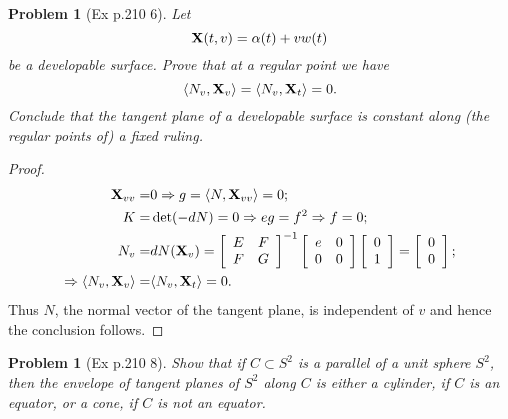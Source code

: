 \documentclass[10pt,a4paper]{article}
\newcounter{theProblemCounter}
\newtheorem{problem}[theProblemCounter]{Problem}
\begin{document}
\setcounter{theProblemCounter}{3}
\begin{problem}[Ex p.210 6]
Let \[
\mathbf{X}(t, v)=\alpha(t)+vw(t)
\]
be a developable surface. Prove that at a regular point we have
\[
\left\langle N_v, \mathbf{X}_v\right\rangle
=\left\langle N_v, \mathbf{X}_t\right\rangle=0.\]
Conclude that \emph{the tangent plane of a developable surface is constant along} (the regular points of) \emph{a fixed ruling}.
\end{problem}
\begin{proof}
\begin{align*}
\mathbf{X}_{vv}=&0 \Rightarrow g=\langle N, \mathbf{X}_{vv}\rangle = 0; \\
K=&\det(-dN)=0 \Rightarrow eg=f^2 \Rightarrow f = 0; \\
N_v =& dN(\mathbf{X}_v) = \left[\begin{array}{cc}E&F\\F&G\end{array}\right]^{-1}\left[\begin{array}{cc}e&0\\0&0\end{array}\right]\left[\begin{array}{c}0\\1\end{array}\right]=\left[\begin{array}{c}0\\0\end{array}\right]; \\
\Rightarrow \langle N_v, \mathbf{X}_v\rangle =& \langle N_v, \mathbf{X}_t\rangle = 0.
\end{align*}
Thus $N$, the normal vector of the tangent plane, is independent of $v$ and hence the conclusion follows.
\end{proof}

\setcounter{theProblemCounter}{4}
\begin{problem}[Ex p.210 8]
Show that if $C\subset S^2$ is a parallel of a unit sphere $S^2$, then the envelope of tangent planes of $S^2$ along $C$ is either a cylinder, if $C$ is an equator, or a cone, if $C$ is not an equator.
\end{problem}
\end{document}
